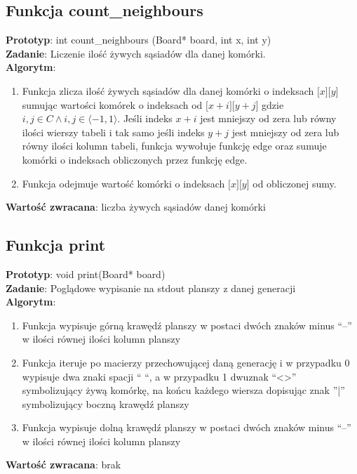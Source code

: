 \documentclass[12pt,a4paper,notitlepage]{report}
\begin{document}
\subsection{Funkcja count\_neighbours}
\textbf {Prototyp}: int count\_neighbours (Board* board, int x, int y)\\
\textbf {Zadanie}: Liczenie ilość żywych sąsiadów dla danej komórki.\\
\textbf {Algorytm}:
\begin{enumerate} 
	\item Funkcja zlicza ilość żywych sąsiadów dla danej komórki o indeksach $\lbrack x \rbrack \lbrack y \rbrack$ sumując wartości komórek o indeksach od $\lbrack x+i\rbrack\lbrack y+j\rbrack$ gdzie $i,j \in C \wedge i,j \in \langle -1,1 \rangle$. Jeśli indeks $x+i$ jest mniejszy od zera lub równy ilości wierszy tabeli i tak samo jeśli indeks $y+j$ jest mniejszy od zera lub równy ilości kolumn tabeli, funkcja wywołuje funkcję edge oraz sumuje komórki o indeksach obliczonych przez funkcję edge.
	\item Funkcja odejmuje wartość komórki o indeksach $\lbrack x \rbrack \lbrack y \rbrack$ od obliczonej sumy.
	
\end{enumerate}
\textbf {Wartość zwracana}: liczba żywych sąsiadów danej komórki

\subsection{Funkcja print}
\textbf {Prototyp}: void print(Board* board)\\
\textbf {Zadanie}: Poglądowe wypisanie na stdout planszy z danej generacji\\
\textbf {Algorytm}:
\begin{enumerate} 
	\item Funkcja wypisuje górną krawędź planszy w postaci dwóch znaków minus “--” w ilości równej ilości kolumn planszy
	\item Funkcja iteruje po macierzy przechowującej daną generację i w przypadku 0 wypisuje dwa znaki spacji “  “, a w przypadku 1 dwuznak  “<>” symbolizujący żywą komórkę, na końcu każdego wiersza dopisując znak ”|” symbolizujący boczną krawędź planszy
	\item Funkcja wypisuje dolną krawędź planszy w postaci dwóch znaków minus “--” w ilości równej ilości kolumn planszy
	
	
\end{enumerate}
\textbf {Wartość zwracana}: brak
\end{document}
